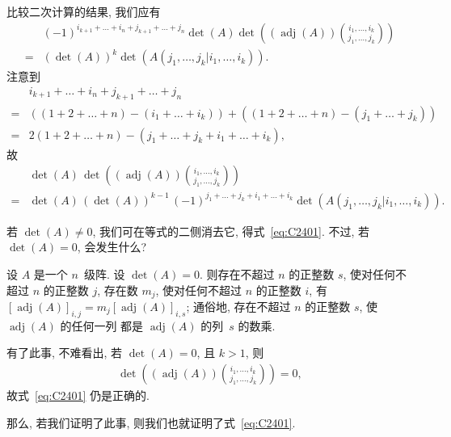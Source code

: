 比较二次计算的结果, 我们应有
\begin{align*}
         &
    (-1)^{i_{k+1}+\dots+i_n+j_{k+1}+\dots+j_n}
    \det {(A)}
    \det {\left(
        (\operatorname{adj} {(A)})
        \binom{i_1,\dots,i_k}{j_1,\dots,j_k}
        \right)}
    \\
    = {} &
    (\det {(A)})^k
    \det {(A({j_1,\dots,j_k}|{i_1,\dots,i_k}))}.
\end{align*}
注意到
\begin{align*}
         &
    i_{k+1} + \dots + i_n + j_{k+1} + \dots + j_n
    \\
    = {} &
    ((1 + 2 + \dots + n) - (i_1 + \dots + i_k))
    + ((1 + 2 + \dots + n) - (j_1 + \dots + j_k))
    \\
    = {} &
    2(1 + 2 + \dots + n) - (j_1 + \dots + j_k + i_1 + \dots + i_k),
\end{align*}
故
\begin{align*}
         &
    \det {(A)}\,
    \det {\left(
        (\operatorname{adj} {(A)})
        \binom{i_1,\dots,i_k}{j_1,\dots,j_k}
        \right)}
    \\
    = {} &
    \det {(A)}\, (\det {(A)})^{k-1}\,
    (-1)^{j_1+\dots+j_k+i_1+\dots+i_k}
    \det {(A({j_1,\dots,j_k}|{i_1,\dots,i_k}))}.
\end{align*}

若 \(\det {(A)} \neq 0\),
我们可在等式的二侧消去它, 得式~\eqref{eq:C2401}.
不过, 若 \(\det {(A)} = 0\),
会发生什么?

\begin{theorem}
    设 \(A\) 是一个 \(n\)~级阵.
    设 \(\det {(A)} = 0\).
    则存在不超过 \(n\) 的正整数 \(s\),
    使对任何不超过 \(n\) 的正整数 \(j\),
    存在数 \(m_j\),
    使对任何不超过 \(n\) 的正整数 \(i\),
    有
    \([\operatorname{adj} {(A)}]_{i,j}
    = m_j [\operatorname{adj} {(A)}]_{i,s}\);
    通俗地,
    存在不超过 \(n\) 的正整数 \(s\),
    使 \(\operatorname{adj} {(A)}\) 的任何一列%
    都是 \(\operatorname{adj} {(A)}\) 的列~\(s\) 的数乘.
\end{theorem}

有了此事, 不难看出, 若 \(\det {(A)} = 0\),
且 \(k > 1\), 则
\begin{align*}
    \det {\left(
        (\operatorname{adj} {(A)})
        \binom{i_1,\dots,i_k}{j_1,\dots,j_k}
        \right)} = 0,
\end{align*}
故式~\eqref{eq:C2401} 仍是正确的.

那么, 若我们证明了此事, 则我们也就证明了式~\eqref{eq:C2401}.

